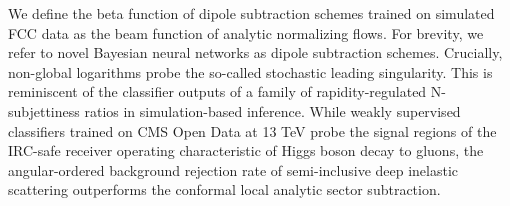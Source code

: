 We define the beta function of dipole subtraction schemes trained on
simulated FCC data as the beam function of analytic normalizing flows.
For brevity, we refer to novel Bayesian neural networks as dipole
subtraction schemes. Crucially, non-global logarithms probe the
so-called stochastic leading singularity. This is reminiscent of the
classifier outputs of a family of rapidity-regulated N-subjettiness
ratios in simulation-based inference. While weakly supervised
classifiers trained on CMS Open Data at 13 TeV probe the signal regions
of the IRC-safe receiver operating characteristic of Higgs boson decay
to gluons, the angular-ordered background rejection rate of
semi-inclusive deep inelastic scattering outperforms the conformal local
analytic sector subtraction.

